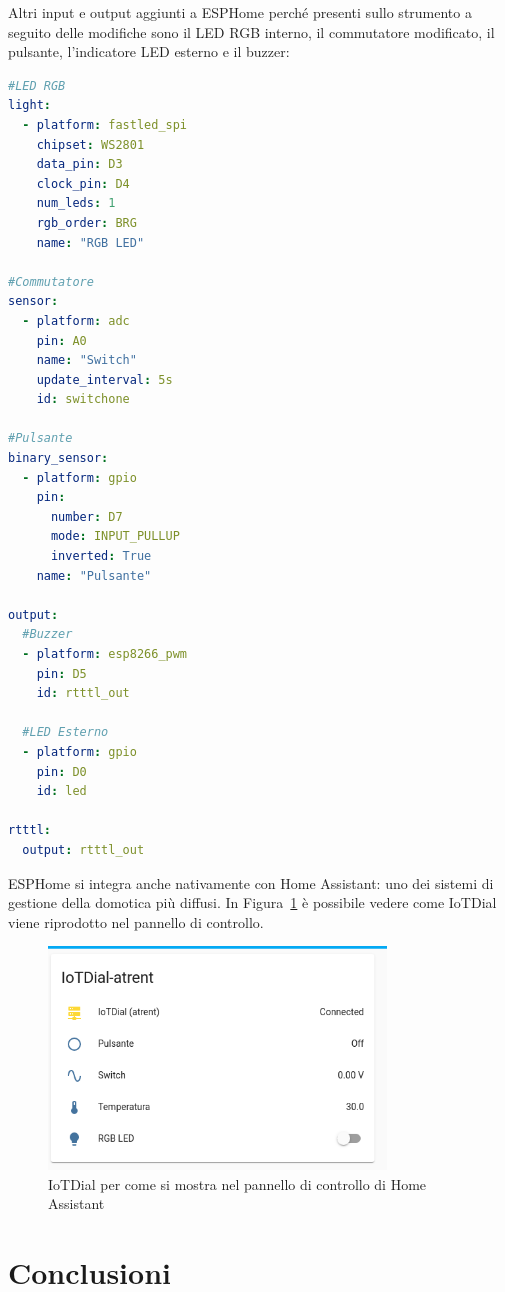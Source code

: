 \documentclass[12pt,a4paper]{report}
\begin{document}
Altri input e output aggiunti a ESPHome perché presenti sullo strumento a seguito delle modifiche sono il LED RGB interno,
il commutatore modificato, il pulsante, l'indicatore LED esterno e il buzzer:
\begin{lstlisting}[language=yaml]
#LED RGB
light:
  - platform: fastled_spi
    chipset: WS2801
    data_pin: D3
    clock_pin: D4
    num_leds: 1
    rgb_order: BRG
    name: "RGB LED"

#Commutatore
sensor:
  - platform: adc
    pin: A0
    name: "Switch"
    update_interval: 5s
    id: switchone

#Pulsante
binary_sensor:
  - platform: gpio
    pin:
      number: D7
      mode: INPUT_PULLUP
      inverted: True
    name: "Pulsante"

output:
  #Buzzer
  - platform: esp8266_pwm
    pin: D5
    id: rtttl_out

  #LED Esterno
  - platform: gpio
    pin: D0
    id: led

rtttl:
  output: rtttl_out
\end{lstlisting}

ESPHome si integra anche nativamente con Home Assistant: uno dei sistemi di gestione della domotica più diffusi. In
Figura~\ref{fig:ha-iotdial} è possibile vedere come IoTDial viene riprodotto nel pannello di controllo. 

\begin{figure}[h]
  \centering
  \includegraphics[width=0.8\textwidth]{ha-iotdial}
  \caption{IoTDial per come si mostra nel pannello di controllo di Home Assistant}
  \label{fig:ha-iotdial}
\end{figure}

\chapter{Conclusioni}
\end{document}
